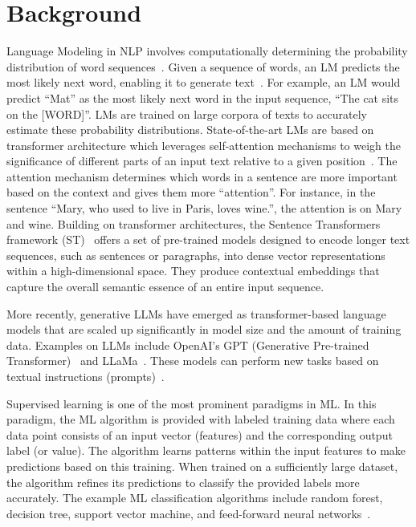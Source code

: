 \section{Background} \label{sec:background}

 Language Modeling in NLP involves computationally determining the probability distribution of word sequences~\cite{Jurafsky:20}. Given a sequence of words, an LM predicts the most likely next word, enabling it to generate text~\cite{Alexandrescu:06}. For example, an LM would predict ``Mat'' as the most likely next word in the input sequence, ``The cat sits on the [WORD]''.  LMs are trained on large corpora of texts to accurately estimate these probability distributions. 
State-of-the-art LMs are based on transformer architecture which leverages self-attention mechanisms to weigh the significance of different parts of an input text relative to a given position~\cite{Vaswani:17}. The attention mechanism determines which words in a sentence are more important based on the context and gives them more ``attention''. For instance, in the sentence ``Mary, who used to live in Paris, loves wine.'', the attention is on Mary and wine.
%
Building on transformer architectures, the Sentence Transformers framework (ST)~\cite{Reimers:19} offers a set of pre-trained models designed to encode longer text sequences, such as sentences or paragraphs, into dense vector representations within a high-dimensional space. They produce contextual embeddings that capture the overall semantic essence of an entire input sequence.

More recently, generative LLMs have emerged as transformer-based language models that are scaled up significantly in model size and the amount of training data. 
Examples on LLMs include OpenAI's GPT (Generative Pre-trained Transformer)~\cite{Radford:18} and LLaMa~\cite{touvron2023llama,touvron2023llama2}. 
These models can perform new tasks based on textual instructions (prompts)~\cite{NEURIPS2020_1457c0d6}.
%

Supervised learning is one of the most prominent paradigms in ML. In this paradigm,  the ML algorithm is provided with labeled training data where each data point consists of an input vector (features) and the corresponding output label (or value). The algorithm learns patterns within the input features to make predictions based on this training. When trained on a sufficiently large dataset, the algorithm refines its predictions to classify the provided labels more accurately. The example ML classification algorithms include random forest, decision tree, support vector machine, and feed-forward neural networks~\cite{Goodfellow:16}.

